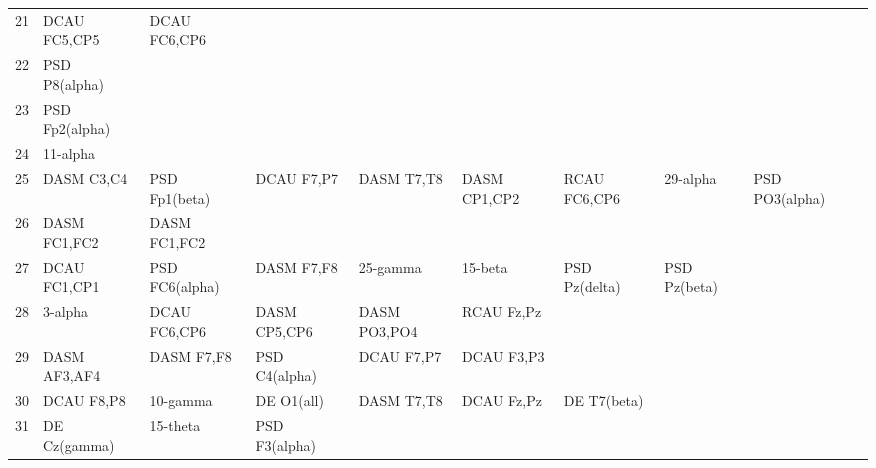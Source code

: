 \begin{landscape}
\begin{table}[]
\begin{tabular}{l|llllllll}
21       & DCAU FC5,CP5   & DCAU FC6,CP6   &                &                &                &                &                &                &               &              \\
22       & PSD P8(alpha)  &                &                &                &                &                &                &                &               &              \\
23       & PSD Fp2(alpha) &                &                &                &                &                &                &                &               &              \\
24       & 11-alpha       &                &                &                &                &                &                &                &               &              \\
25       & DASM C3,C4     & PSD Fp1(beta)  & DCAU F7,P7     & DASM T7,T8     & DASM CP1,CP2   & RCAU FC6,CP6   & 29-alpha       & PSD PO3(alpha) &               &              \\
26       & DASM FC1,FC2   & DASM FC1,FC2   &                &                &                &                &                &                &               &              \\
27       & DCAU FC1,CP1   & PSD FC6(alpha) & DASM F7,F8     & 25-gamma       & 15-beta        & PSD Pz(delta)  & PSD Pz(beta)   &                &               &              \\
28       & 3-alpha        & DCAU FC6,CP6   & DASM CP5,CP6   & DASM PO3,PO4   & RCAU Fz,Pz     &                &                &                &               &              \\
29       & DASM AF3,AF4   & DASM F7,F8     & PSD C4(alpha)  & DCAU F7,P7     & DCAU F3,P3     &                &                &                &               &              \\
30       & DCAU F8,P8     & 10-gamma       & DE O1(all)     & DASM T7,T8     & DCAU Fz,Pz     & DE T7(beta)    &                &                &               &              \\
31       & DE Cz(gamma)   & 15-theta       & PSD F3(alpha)  &                &                &                &                &                &               &              \\
\end{tabular}
\end{table}
\end{landscape}
\clearpage
